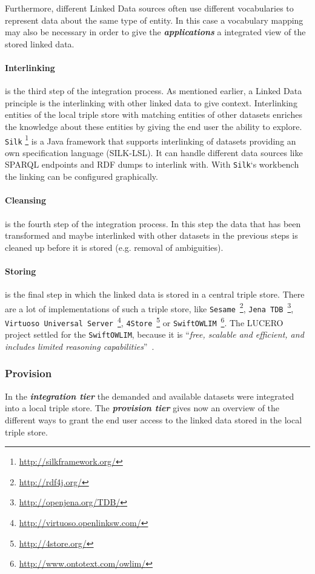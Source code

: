 \documentclass{article}
\begin{document}
Furthermore, different Linked Data sources often use different vocabularies to represent data about the same type of entity.\cite{berners-lee_fractal_2008} In this case a vocabulary mapping may also be necessary in order to give the \textit{\textbf{applications}} a integrated view of the stored linked data. 

\paragraph{Interlinking} is the third step of the integration process. As mentioned earlier, a Linked Data principle is the interlinking with other linked data to give context. Interlinking entities of the local triple store with matching entities of other datasets enriches the knowledge about these entities by giving the end user the ability to explore. \texttt{Silk} \footnote{\url{http://silkframework.org/}} is a Java framework that supports interlinking of datasets providing an own specification language (SILK-LSL). It can handle different data sources like SPARQL endpoints and RDF dumps to interlink with. With \texttt{Silk}`s workbench the linking can be configured graphically.

\paragraph{Cleansing} is the fourth step of the integration process. In this step the data that has been transformed and maybe interlinked with other datasets in the previous steps is cleaned up before it is stored (e.g. removal of ambiguities).

\paragraph{Storing} is the final step in which the linked data is stored in a central triple store. There are a lot of implementations of such a triple store, like 
\texttt{Sesame}~\footnote{\url{http://rdf4j.org/}}, 
\texttt{Jena TDB}~\footnote{\url{http://openjena.org/TDB/}},
\texttt{Virtuoso Universal Server}~\footnote{\url{http://virtuoso.openlinksw.com/}},
\texttt{4Store}~\footnote{\url{http://4store.org/}} or 
\texttt{SwiftOWLIM}~\footnote{\url{http://www.ontotext.com/owlim/}}. The LUCERO project settled for the \texttt{SwiftOWLIM}, because it is ``\textit{free, scalable and efficient, and includes limited reasoning capabilities}''~\cite{daquin_lucero_2010-1}.

\subsubsection{Provision}
\label{technical-architecture-challenges:proposal:provision}
In the \textit{\textbf{integration tier}} the demanded and available datasets were integrated into a local triple store. The \textit{\textbf{provision tier}} gives now an overview of the different ways to grant the end user access to the linked data stored in the local triple store.
\end{document}
